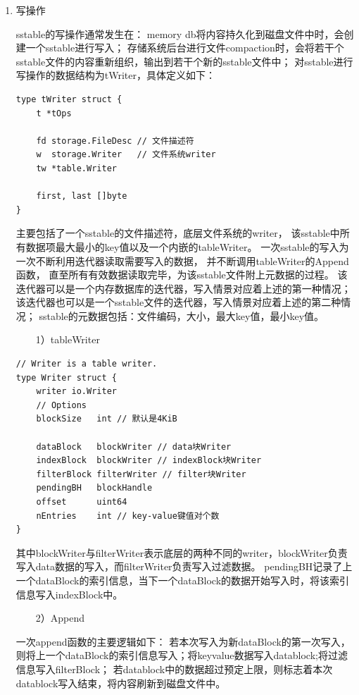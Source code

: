 \begin{enumerate}
				\begin{enumerate}
					\item 写操作
					
					sstable的写操作通常发生在：
memory db将内容持久化到磁盘文件中时，会创建一个sstable进行写入；
存储系统后台进行文件compaction时，会将若干个sstable文件的内容重新组织，输出到若干个新的sstable文件中；
对sstable进行写操作的数据结构为tWriter，具体定义如下：

\begin{lstlisting}[caption=tWriter , label=code_radds_storage_tWriter]
type tWriter struct {
	t *tOps
	
	fd storage.FileDesc // 文件描述符
	w  storage.Writer   // 文件系统writer
	tw *table.Writer
	
	first, last []byte
}
\end{lstlisting}

主要包括了一个sstable的文件描述符，底层文件系统的writer，
该sstable中所有数据项最大最小的key值以及一个内嵌的tableWriter。
一次sstable的写入为一次不断利用迭代器读取需要写入的数据，
并不断调用tableWriter的Append函数，
直至所有有效数据读取完毕，为该sstable文件附上元数据的过程。
该迭代器可以是一个内存数据库的迭代器，写入情景对应着上述的第一种情况；
该迭代器也可以是一个sstable文件的迭代器，写入情景对应着上述的第二种情况；
sstable的元数据包括：文件编码，大小，最大key值，最小key值。



				\ \ \ \ 1）tableWriter

\begin{lstlisting}[caption=tableWriter , label=code_radds_storage_Writer]
// Writer is a table writer.
type Writer struct {
	writer io.Writer
	// Options
	blockSize   int // 默认是4KiB

	dataBlock   blockWriter // data块Writer
	indexBlock  blockWriter // indexBlock块Writer
	filterBlock filterWriter // filter块Writer
	pendingBH   blockHandle
	offset      uint64
	nEntries    int // key-value键值对个数
}				
\end{lstlisting}

			其中blockWriter与filterWriter表示底层的两种不同的writer，blockWriter负责写入data数据的写入，而filterWriter负责写入过滤数据。
			pendingBH记录了上一个dataBlock的索引信息，当下一个dataBlock的数据开始写入时，将该索引信息写入indexBlock中。
			
			\ \ \ \ 2）Append 
				
					一次append函数的主要逻辑如下：
若本次写入为新dataBlock的第一次写入，则将上一个dataBlock的索引信息写入；将keyvalue数据写入datablock;将过滤信息写入filterBlock；
若datablock中的数据超过预定上限，则标志着本次datablock写入结束，将内容刷新到磁盘文件中。


\end{enumerate}
\end{enumerate}
